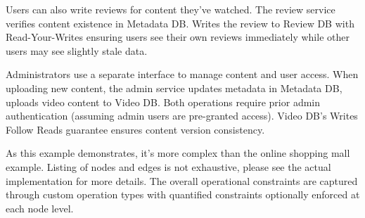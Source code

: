 Users can also write reviews for content they've watched. The review service
verifies content existence in Metadata DB. Writes the review to Review DB with
Read-Your-Writes ensuring users see their own reviews immediately while other
users may see slightly stale data.

Administrators use a separate interface to manage content and user access. When
uploading new content, the admin service updates metadata in Metadata DB,
uploads video content to Video DB. Both operations require prior admin
authentication (assuming admin users are pre-granted access). Video DB's Writes
Follow Reads guarantee ensures content version consistency.

As this example demonstrates, it's more complex than the online shopping mall
example. Listing of nodes and edges is not exhaustive, please see the actual
implementation for more details. The overall operational constraints are
captured through custom operation types with quantified constraints optionally
enforced at each node level.

